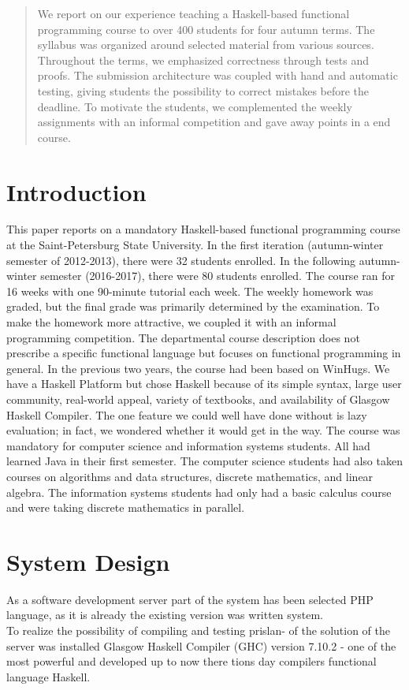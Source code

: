 \documentclass{acmtog} %
\begin{document}
\begin{abstract}
We report on our experience teaching a Haskell-based functional
programming course to over 400 students for four autumn terms.
The syllabus was organized around selected material from various
sources. Throughout the terms, we emphasized correctness through tests and proofs. The submission architecture
was coupled with hand and automatic testing, giving students the possibility
to correct mistakes before the deadline. To motivate the students,
we complemented the weekly assignments with an informal
competition and gave away points in a end course.
\end{abstract}

\section{Introduction}

This paper reports on a mandatory Haskell-based functional programming course at the Saint-Petersburg State University. In the
first iteration (autumn-winter semester of 2012-2013), there were 32 students
enrolled. In the following autumn-winter semester (2016-2017), there
were 80 students enrolled. The course ran for 16 weeks with one 90-minute tutorial each week. The weekly homework was graded, but the final grade was primarily
determined by the examination. To make the homework more attractive,
we coupled it with an informal programming competition.
The departmental course description does not prescribe a specific
functional language but focuses on functional programming
in general. In the previous two years, the course had been based
on WinHugs. We have a Haskell Platform but
chose Haskell because of its simple syntax, large user community,
real-world appeal, variety of textbooks, and availability of Glasgow Haskell Compiler. The one feature we could well have done without is lazy
evaluation; in fact, we wondered whether it would get in the way.
The course was mandatory for computer science 
and information systems students. All had
learned Java in their first semester. The computer science students
had also taken courses on algorithms and data structures, discrete
mathematics, and linear algebra. The information systems students
had only had a basic calculus course and were taking discrete
mathematics in parallel.
 

\section{System Design}
\label{sec:system_design}
%
As a software development server part of the system has been selected
PHP language, as it is already the existing version was written
system.\\
To realize the possibility of compiling and testing prislan-
of the solution of the server was installed Glasgow Haskell Compiler
(GHC) version 7.10.2 - one of the most powerful and developed up to now there
tions day compilers functional language Haskell.
\end{document}
